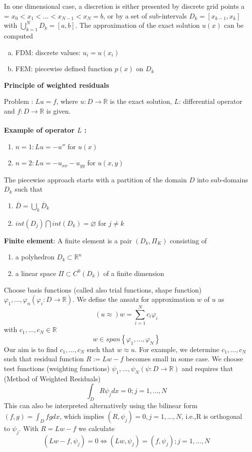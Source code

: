 \documentclass{article}
\begin{document}
In one dimensional case, a discretion is either presented by discrete grid points a = $x_0 < x_1 < ... < x_{N-1} < x_N = b$, or by a set of sub-intervals $D_k = [x_{k-1},x_k]$ with $\bigcup_{k=1}^{N}D_k = [a,b]$. The approximation of the exact solution $u(x)$ can be computed

\begin{enumerate}[(a)]
	\item FDM: discrete values: $u_i = u(x_i)$
	\item FEM: piecewise defined function $p(x)$ on $D_k$
\end{enumerate}
\textbf{Principle of weighted residuals}

Problem : $Lu = f$, where $u :D \rightarrow \mathbb{R}$ is the exact solution, $L$: differential operator and $f: D \rightarrow \mathbb{R}$ is given.\\\\
\textbf{Example of operator $L$ :}
\begin{enumerate}[$(i)$]
\item $ n = 1 : Lu = -u''$ for $u(x)$
\item $ n = 2 : Lu = -u_{xx}- u_{yy}$ for $u(x,y)$
\end{enumerate}
The piecewise approach starts with a partition of the domain $D$ into sub-domains $D_k$ such that
\begin{enumerate}[$(i)$]
\item $\bar{D} = \bigcup_k \bar{D}_k$
\item $ int(D_j) \bigcap int(D_k) = \varnothing $ for $j \neq k$
\end{enumerate}
\textbf{Finite element}:  
A finite element is a pair $(D_k, \Pi_K)$ consisting of 
\begin{enumerate}[$(i)$]
\item a polyhedron $D_k \subset \mathbb{R}^n$
\item a linear space $ \Pi \subset C^0(D_k)$ of a finite dimension
\end{enumerate}
Choose basis functions (called also trial functions, shape function)$\varphi_1, ... , \varphi_n(\varphi_i : D \rightarrow \mathbb{R})$. We define the ansatz for approximation $w$ of $u$ as 
$$
(u \approx) w = \sum_{i=1}^{N}c_i \varphi_i$$ with 
$ c_1, ... , c_N \in \mathbb{R}$
$$
w \in span\left \{\varphi_1, ... , \varphi_N  \right \}
$$
Our aim is to find $c_1,...,c_N$ such that $w \approx u$. For example, we determine $c_1,...,c_N$ such that residual function $R := Lw-f$ becomes small in some case. We choose test functions (weighting functions) $\psi_1, ... , \psi_N (\psi:D \rightarrow \mathbb{R})$ and requires that (Method of Weighted Residuals)
$$
\int_{D}R\psi_jdx = 0; j = 1,...,N
$$
This can also be interpreted alternatively using the bilinear form $(f,g) = \int_D fgdx$, which implies $(R, \psi_j) = 0, j = 1, ... , N$, i.e.,R is orthogonal to $\psi_j$. With $R = Lw - f$ we calculate
$$
(Lw - f, \psi_j) = 0 \Leftrightarrow (Lw,\psi_j) = (f, \psi_j); j = 1,...,N
$$
\end{document}
